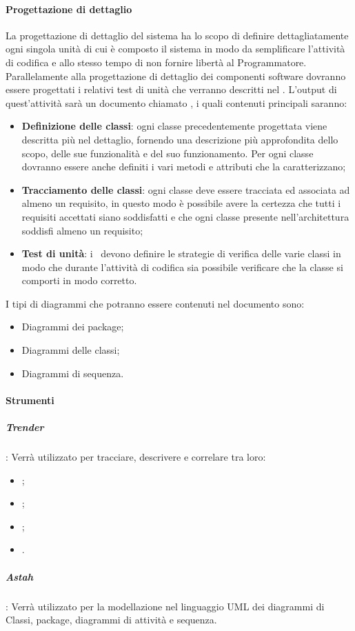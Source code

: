 \documentclass[../NormeDiProgetto_v4.0.0.tex]{subfiles}
\begin{document}
		\paragraph{Progettazione di dettaglio}
			La progettazione di dettaglio del sistema ha lo scopo di
			definire dettagliatamente ogni singola unità di cui è composto il sistema in modo da semplificare
			l'attività di codifica e allo stesso tempo di non fornire libertà al Programmatore.
			Parallelamente alla progettazione di dettaglio dei componenti software dovranno essere progettati
			i relativi test di unità che verranno descritti nel \pianodiqualifica.
			L'output di quest'attività sarà un documento chiamato , i quali contenuti principali saranno:
			\begin{itemize}
				\item \textbf{Definizione delle classi}: ogni classe precedentemente progettata viene descritta più nel
				dettaglio, fornendo una descrizione più approfondita dello scopo, delle sue funzionalità e del
				suo funzionamento. Per ogni classe dovranno essere anche definiti i vari metodi e attributi
				che la caratterizzano;
				\item \textbf{Tracciamento delle classi}: ogni classe deve essere tracciata ed associata ad almeno un
				requisito, in questo modo è possibile avere la certezza che tutti i requisiti accettati siano
				soddisfatti e che ogni classe presente nell'architettura soddisfi almeno un requisito;
				\item \textbf{Test di unità}: i \progettisti\ devono definire le strategie di verifica delle varie classi in modo
				che durante l'attività di codifica sia possibile verificare che la classe si comporti in modo
				corretto.
			\end{itemize}

			I tipi di diagrammi che potranno essere contenuti nel documento sono:
			\begin{itemize}
				\item Diagrammi dei package;
				\item Diagrammi delle classi;
				\item Diagrammi di sequenza.
			\end{itemize}

		\paragraph{Strumenti}
			\subparagraph{Trender}: Verrà utilizzato per tracciare, descrivere e correlare tra loro:
					\begin{itemize}
						\item {};
						\item {};
						\item {};
						\item {}.
					\end{itemize}
			\subparagraph{Astah}: Verrà utilizzato per la modellazione nel linguaggio UML dei diagrammi di Classi, package, diagrammi di attività e sequenza.
		
\end{document}
